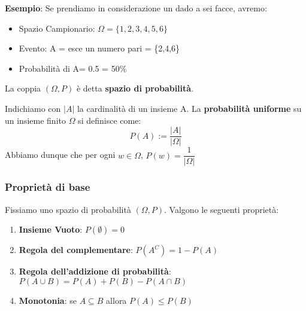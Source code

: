  \begin{tcolorbox}
     \textbf{Esempio}: Se prendiamo in considerazione un dado a sei facce, avremo:
        \begin{itemize}
            \item Spazio Campionario: $\Omega = \{1,2,3,4,5,6\}$
            \item Evento: A = esce un numero pari = \{2,4,6\}
            \item Probabilità di A= 0.5 = 50\%
        \end{itemize}
 \end{tcolorbox}

\noindent La coppia $(\Omega, P)$ è detta \textbf{spazio di probabilità}. \newline

\noindent Indichiamo con $|A|$ la cardinalità di un insieme A. La \textbf{probabilità uniforme} su un insieme finito $\Omega$ si definisce come: $$P(A) := \dfrac{|A|}{|\Omega|}$$ Abbiamo dunque che per ogni $w \in \Omega$, $\mathit{P({w}) = \dfrac{1}{|\Omega|}}$

\subsubsection{Proprietà di base}

Fissiamo uno spazio di probabilità $(\Omega, P)$. Valgono le seguenti proprietà:
\begin{enumerate}
    \item \textbf{Insieme Vuoto}: $P(\emptyset)=0$
    \item \textbf{Regola del complementare}: $P(A^C)= 1 - P(A)$
    \item \textbf{Regola dell'addizione di probabilità}: $P(A \cup B) = P(A) + P(B) - P(A \cap B)$
    \item \textbf{Monotonia}: se $ A \subseteq B $ allora $ P(A) \leq P(B) $
\end{enumerate}


